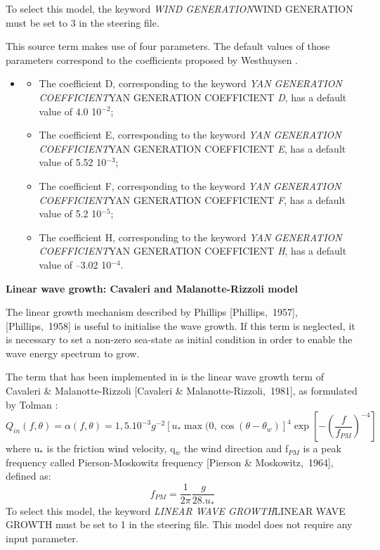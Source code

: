  To select this model, the keyword \textit{WIND GENERATION}WIND GENERATION must be set to 3 in the steering file.

 This source term makes use of four parameters. The default values of those parameters correspond to the coefficients proposed by Westhuysen \cite{Westhuys2007}.

\begin{itemize}
\item \begin{itemize}
\item  The coefficient D, corresponding to the keyword \textit{YAN GENERATION COEFFICIENT}YAN GENERATION COEFFICIENT\textit{ D}, has a default value of 4.0 10${}^{-2}$;

\item  The coefficient E, corresponding to the keyword \textit{YAN GENERATION COEFFICIENT}YAN GENERATION COEFFICIENT\textit{ E}, has a default value of 5.52 10${}^{-3}$;

\item  The coefficient F, corresponding to the keyword \textit{YAN GENERATION COEFFICIENT}YAN GENERATION COEFFICIENT\textit{ F}, has a default value of 5.2 10${}^{-5}$;

\item  The coefficient H, corresponding to the keyword \textit{YAN GENERATION COEFFICIENT}YAN GENERATION COEFFICIENT\textit{ H}, has a default value of --3.02 10${}^{-4}$.
\end{itemize}
\end{itemize}




{\bf  Linear wave growth: Cavaleri and Malanotte-Rizzoli model}

 The linear growth mechanism described by Phillips [Phillips,~1957], [Phillips,~1958] is useful to initialise the wave growth. If this term is neglected, it is necessary to set a non-zero sea-state as initial condition in order to enable the wave energy spectrum to grow.

 The term that has been implemented in \tomawac is the linear wave growth term of Cavaleri \& Malanotte-Rizzoli [Cavaleri \& Malanotte-Rizzoli,~1981], as formulated by Tolman \cite{Tolman1992}:
\begin{equation} \label{GrindEQ__4_35_}
Q_{in} (f,\theta )=\alpha (f,\theta )=1,5.10^{-3} g^{-2} \left[u_{*} \max (0,\cos \left(\theta -\theta _{w} \right)\right]^{4} \exp \left[-\left(\frac{f}{f_{PM} } \right)^{-4} \right]
\end{equation}
where u${}_{*}$ is the friction wind velocity, q${}_{w}$ the wind direction and f${}_{PM}$ is a peak frequency called Pierson-Moskowitz frequency [Pierson \& Moskowitz,~1964], defined as:
\begin{equation} \label{GrindEQ__4_36_}
f_{PM} =\frac{1}{2\pi } \frac{g}{28.u_{*} }
\end{equation}
To select this model, the keyword \textit{LINEAR WAVE GROWTH}LINEAR WAVE GROWTH must be set to 1 in the steering file. This model does not require any input parameter.




